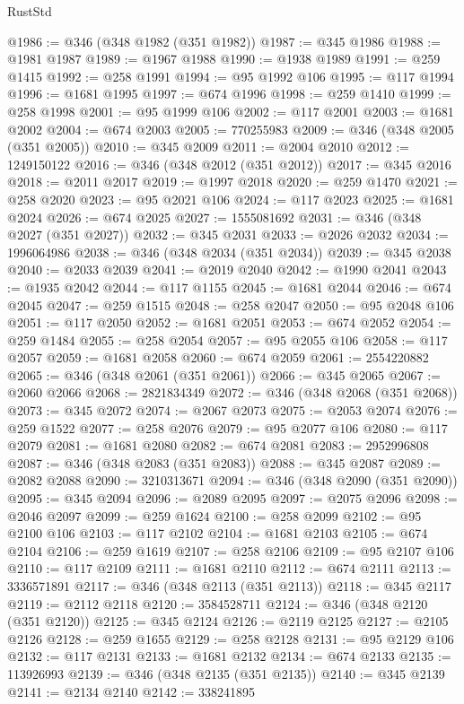 \begin{lexlean}{RustStd}
\begin{coremodule}
{\begin{coremodule}
{{{{{{{{{{{{{{{{{{{{{{{{{{{{{{{{{{{{{{{@1986 := @346 (@348 @1982 (@351 @1982))
@1987 := @345 @1986
@1988 := @1981 @1987
@1989 := @1967 @1988
@1990 := @1938 @1989
@1991 := @259 @1415
@1992 := @258 @1991
@1994 := @95 @1992 @106
@1995 := @117 @1994
@1996 := @1681 @1995
@1997 := @674 @1996
@1998 := @259 @1410
@1999 := @258 @1998
@2001 := @95 @1999 @106
@2002 := @117 @2001
@2003 := @1681 @2002
@2004 := @674 @2003
@2005 := 770255983
@2009 := @346 (@348 @2005 (@351 @2005))
@2010 := @345 @2009
@2011 := @2004 @2010
@2012 := 1249150122
@2016 := @346 (@348 @2012 (@351 @2012))
@2017 := @345 @2016
@2018 := @2011 @2017
@2019 := @1997 @2018
@2020 := @259 @1470
@2021 := @258 @2020
@2023 := @95 @2021 @106
@2024 := @117 @2023
@2025 := @1681 @2024
@2026 := @674 @2025
@2027 := 1555081692
@2031 := @346 (@348 @2027 (@351 @2027))
@2032 := @345 @2031
@2033 := @2026 @2032
@2034 := 1996064986
@2038 := @346 (@348 @2034 (@351 @2034))
@2039 := @345 @2038
@2040 := @2033 @2039
@2041 := @2019 @2040
@2042 := @1990 @2041
@2043 := @1935 @2042
@2044 := @117 @1155
@2045 := @1681 @2044
@2046 := @674 @2045
@2047 := @259 @1515
@2048 := @258 @2047
@2050 := @95 @2048 @106
@2051 := @117 @2050
@2052 := @1681 @2051
@2053 := @674 @2052
@2054 := @259 @1484
@2055 := @258 @2054
@2057 := @95 @2055 @106
@2058 := @117 @2057
@2059 := @1681 @2058
@2060 := @674 @2059
@2061 := 2554220882
@2065 := @346 (@348 @2061 (@351 @2061))
@2066 := @345 @2065
@2067 := @2060 @2066
@2068 := 2821834349
@2072 := @346 (@348 @2068 (@351 @2068))
@2073 := @345 @2072
@2074 := @2067 @2073
@2075 := @2053 @2074
@2076 := @259 @1522
@2077 := @258 @2076
@2079 := @95 @2077 @106
@2080 := @117 @2079
@2081 := @1681 @2080
@2082 := @674 @2081
@2083 := 2952996808
@2087 := @346 (@348 @2083 (@351 @2083))
@2088 := @345 @2087
@2089 := @2082 @2088
@2090 := 3210313671
@2094 := @346 (@348 @2090 (@351 @2090))
@2095 := @345 @2094
@2096 := @2089 @2095
@2097 := @2075 @2096
@2098 := @2046 @2097
@2099 := @259 @1624
@2100 := @258 @2099
@2102 := @95 @2100 @106
@2103 := @117 @2102
@2104 := @1681 @2103
@2105 := @674 @2104
@2106 := @259 @1619
@2107 := @258 @2106
@2109 := @95 @2107 @106
@2110 := @117 @2109
@2111 := @1681 @2110
@2112 := @674 @2111
@2113 := 3336571891
@2117 := @346 (@348 @2113 (@351 @2113))
@2118 := @345 @2117
@2119 := @2112 @2118
@2120 := 3584528711
@2124 := @346 (@348 @2120 (@351 @2120))
@2125 := @345 @2124
@2126 := @2119 @2125
@2127 := @2105 @2126
@2128 := @259 @1655
@2129 := @258 @2128
@2131 := @95 @2129 @106
@2132 := @117 @2131
@2133 := @1681 @2132
@2134 := @674 @2133
@2135 := 113926993
@2139 := @346 (@348 @2135 (@351 @2135))
@2140 := @345 @2139
@2141 := @2134 @2140
@2142 := 338241895
}}}}}}}}}}}}}}}}}}}}}}}}}}}}}}}}}}}}}}}
\end{coremodule}}
\end{coremodule}
\end{lexlean}
